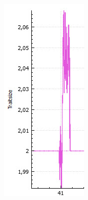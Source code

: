 \documentclass[11pt, a4paper, german]{article}
\theoremstyle{plain}
\begin{document}
\begin{center}
\begin{minipage}{0.6\textwidth}
\begin{minipage}{0.45\textwidth}
		\includegraphics[width=1\linewidth]{./Pictures/TSS_DomZoomVgl_original}

\end{minipage}
\end{minipage}
\end{center}
\end{document}
